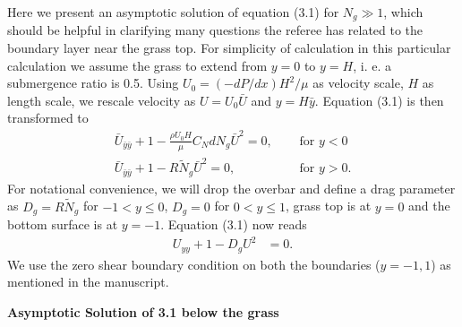 \documentclass[letterpaper,10pt]{article}
\newcommand{\Ndg}{\tilde{N}_g}
\begin{document}
Here we present an asymptotic solution of equation (3.1) for $N_g \gg 1$, which should be helpful in clarifying many questions the referee has related to the boundary layer near the grass top. For simplicity of calculation in this particular calculation we assume the grass to extend from $y=0$ to $y=H$, i. e. a submergence ratio is 0.5. 
Using $ U_0 = (-dP/dx)H^2/\mu$ as velocity scale, $H$ as length scale, we rescale velocity as $U= U_0 \bar{U}$ and $y = H \bar{y}$. Equation (3.1) is then transformed to  
\begin{equation}
\begin{split}
 \bar{U}_{\bar{y}\bar{y}}+1 - \frac{\rho U_0 H}{\mu} C_N d N_g \bar{U}^2 =0, \quad &\text{ for } y<0\\
 \bar{U}_{\bar{y}\bar{y}}+1 - R \Ndg \bar{U}^2=0, \quad &\text{ for } y>0.
\end{split}
\end{equation}
For notational convenience, we will drop the overbar and define a drag parameter as $D_g = R\Ndg$ for $-1<y\le 0$, $D_g = 0$ for $0<y\le 1$, grass top is at $y=0$ and the bottom surface is at $y=-1$. Equation (3.1) now reads
\begin{equation}
\begin{split}
 {U}_{{y}{y}}+1 - D_g{U}^2 &=0.
\end{split}
\end{equation}
We use the zero shear boundary condition on both the boundaries ($y=-1,1$) as mentioned in the manuscript.

\vspace{2mm}
\noindent
\textbf{Asymptotic Solution of 3.1 below the grass}
\end{document}

